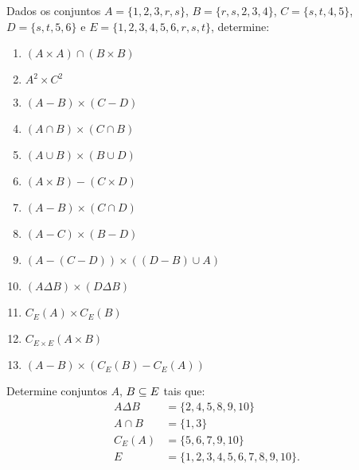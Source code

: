 \documentclass[12pt]{exam}
\begin{document}
    \questao{} Dados os conjuntos $A = \{1, 2, 3, r, s\}$, $B = \{r, s, 2, 3, 4\}$, $C = \{s, t, 4, 5\}$, $D = \{s, t, 5, 6\}$ e $E = \{1, 2, 3, 4, 5, 6, r, s, t\}$, determine:
    \begin{multicols}{2}
        \begin{enumerate}[label={\alph*})]
            \item $(A \times A) \cap (B \times B)$

            \item $A^2 \times C^2$

            \item $(A - B) \times (C - D)$

            \item $(A \cap B) \times (C \cap B)$

            \item $(A \cup B) \times (B \cup D)$

            \item $(A \times B) - (C \times D)$

            \item $(A - B) \times (C \cap D)$

            \item $(A - C) \times (B - D)$

            \item $(A - (C - D)) \times ((D - B) \cup A)$

            \item $(A \Delta B) \times (D \Delta B)$

            \item $C_E(A) \times C_E(B)$

            \item $C_{E\times E}(A \times B)$

            \item $(A - B) \times (C_E(B) - C_E(A))$
        \end{enumerate}

    \end{multicols}

    \questao{} Determine conjuntos $A$, $B \subseteq E$ tais que:
    \begin{align*}
        A \Delta B &= \{2, 4, 5, 8, 9, 10\}\\
        A \cap B &= \{1, 3\}\\
        C_E(A) &= \{5, 6, 7, 9, 10\}\\
        E &= \{1, 2, 3, 4, 5, 6, 7, 8, 9, 10\}.
    \end{align*}
\end{document}
